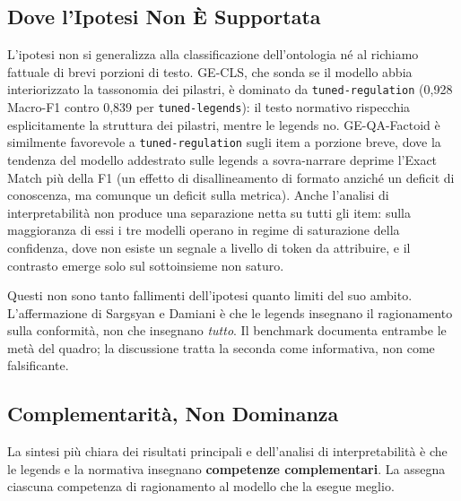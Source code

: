 \documentclass[pdflatex, sn-apa]{sn-jnl}%
\theoremstyle{thmstyleone}%
\theoremstyle{thmstyletwo}%
\theoremstyle{thmstylethree}%
\newcommand{\modellegends}{\texttt{tuned-legends}}
\newcommand{\modelreg}{\texttt{tuned-regulation}}
\begin{document}
\subsection{Dove l'Ipotesi Non È Supportata}
\label{sec:disc:notsupported}

L'ipotesi non si generalizza alla classificazione dell'ontologia né al richiamo
fattuale di brevi porzioni di testo. GE-CLS, che sonda se il modello abbia
interiorizzato la tassonomia dei pilastri, è dominato da \modelreg{} (0,928
Macro-F1 contro 0,839 per \modellegends): il testo normativo rispecchia
esplicitamente la struttura dei pilastri, mentre le legends no. GE-QA-Factoid è
similmente favorevole a \modelreg{} sugli item a porzione breve, dove la tendenza
del modello addestrato sulle legends a sovra-narrare deprime l'Exact Match più
della F1 (un effetto di disallineamento di formato anziché un deficit di
conoscenza, ma comunque un deficit sulla metrica). Anche l'analisi di
interpretabilità non produce una separazione netta su tutti gli item: sulla
maggioranza di essi i tre modelli operano in regime di saturazione della
confidenza, dove non esiste un segnale a livello di token da attribuire, e il
contrasto emerge solo sul sottoinsieme non saturo.

Questi non sono tanto fallimenti dell'ipotesi quanto limiti del suo ambito.
L'affermazione di Sargsyan e Damiani è che le legends insegnano il ragionamento
sulla conformità, non che insegnano \emph{tutto}. Il benchmark documenta entrambe
le metà del quadro; la discussione tratta la seconda come informativa, non come
falsificante.

\subsection{Complementarità, Non Dominanza}
\label{sec:disc:complementarity}

La sintesi più chiara dei risultati principali e dell'analisi di interpretabilità è
che le legends e la normativa insegnano \textbf{competenze complementari}. La
 assegna ciascuna competenza di ragionamento al modello
che la esegue meglio.
\end{document}
